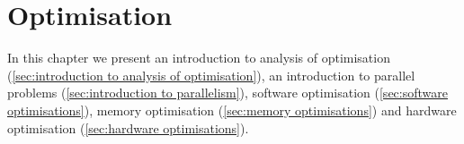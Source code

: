 \chapter{Optimisation}
\label{chap:optimisation}

In this chapter we present an introduction to analysis of optimisation (\cref{sec:introduction to analysis of optimisation}), an introduction to parallel problems (\cref{sec:introduction to parallelism}), software optimisation (\cref{sec:software optimisations}), memory optimisation (\cref{sec:memory optimisations}) and hardware optimisation (\cref{sec:hardware optimisations}).






